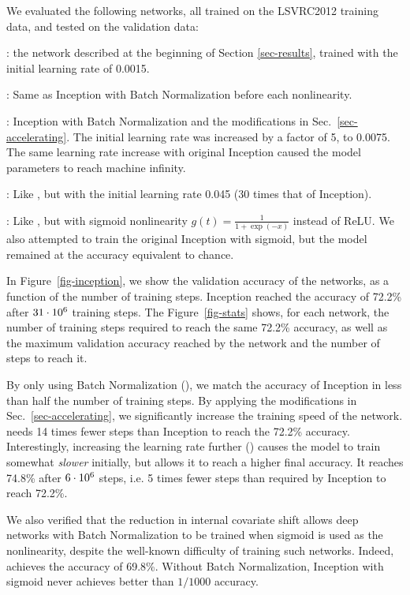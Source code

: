 \documentclass[twocolumn]{article}
\begin{document}
We evaluated the following networks, all trained on the LSVRC2012 training data, and tested on the validation data:


: the network described at the beginning of Section \ref{sec-results}, trained with the initial learning rate of 0.0015.

: Same as Inception with Batch Normalization before each nonlinearity.

: Inception with Batch Normalization and the modifications  in Sec.~\ref{sec-accelerating}. The initial learning rate was increased by a factor of 5, to 0.0075. The same learning rate increase with original Inception caused the model parameters to reach machine infinity.

: Like , but with the initial learning rate  0.045 (30 times that of Inception).

: Like , but with sigmoid nonlinearity $g(t)=\frac{1}{1+\exp(-x)}$ instead of ReLU.
We also attempted to train the original Inception with sigmoid, but the model remained at the  accuracy equivalent to chance.

In Figure~\ref{fig-inception}, we show the validation accuracy of the
networks, as a function of the number of training steps.  Inception
reached the accuracy of 72.2\% after $31\cdot 10^6$ training steps. The
Figure~\ref{fig-stats} shows, for each network, the number of training
steps required to reach the same 72.2\% accuracy, as well as the
maximum validation accuracy reached by the network and the number of steps
to reach it.
 
By only using Batch Normalization (), we match the accuracy of Inception in less than half the number of training steps. By applying the modifications in Sec.~\ref{sec-accelerating}, we significantly increase the training speed of the network.  needs 14 times fewer steps than Inception to reach the 72.2\% accuracy.
Interestingly, increasing the learning rate further ()  causes the model to train somewhat {\em slower} initially, but allows it to reach a higher final accuracy. It  reaches  74.8\% after $6\cdot 10^6$ steps, i.e. 5 times fewer steps than required by Inception to reach 72.2\%.

We also verified that the  reduction in internal covariate shift allows deep networks with Batch Normalization to be trained when sigmoid is used as the nonlinearity, despite the well-known difficulty of training such networks. Indeed,  achieves the accuracy of  69.8\%. Without Batch Normalization, Inception with sigmoid never achieves better than $1/1000$ accuracy.
\end{document}
